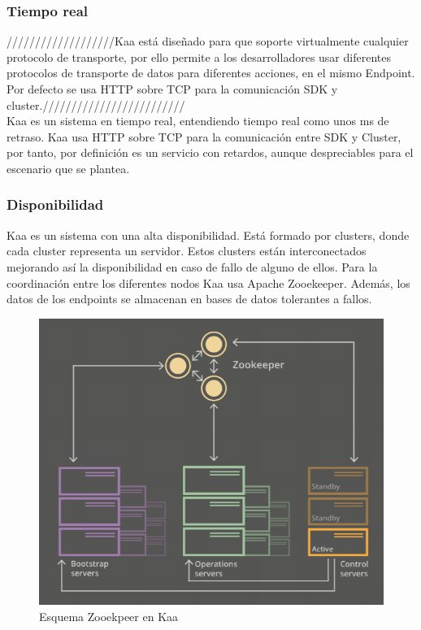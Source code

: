 \documentclass[12pt, twoside]{book}
\begin{document}
\subsubsection*{Tiempo real}
///////////////////Kaa está diseñado para que soporte virtualmente cualquier protocolo de transporte, por ello permite a los desarrolladores usar diferentes protocolos de transporte de datos para diferentes acciones, en el mismo Endpoint. Por defecto se usa HTTP sobre TCP para la comunicación SDK y cluster./////////////////////////\\
Kaa es un sistema en tiempo real, entendiendo tiempo real como unos ms de retraso. Kaa usa HTTP sobre TCP para la comunicación entre SDK y Cluster, por tanto, por definición es un servicio con retardos, aunque despreciables para el escenario que se plantea.


\subsubsection*{Disponibilidad}
Kaa es un sistema con una alta disponibilidad. Está formado por clusters, donde cada cluster representa un servidor. Estos clusters están interconectados mejorando así la disponibilidad en caso de fallo de alguno de ellos. Para la coordinación entre los diferentes nodos Kaa usa Apache Zooekeeper. Además, los datos de los endpoints se almacenan en bases de datos tolerantes a fallos.
\begin{figure}[H]
\centering
\includegraphics[scale=0.5]{images/disponibilidad_captura}
\caption{Esquema Zooekpeer en Kaa}\label{L506}
\end{figure} 
\end{document}
